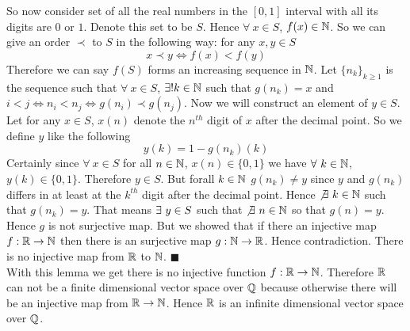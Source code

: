 \documentclass[a4paper, 11pt]{article}
\renewenvironment{proof}{\noindent{\it \textbf{Proof:}}\hspace*{1em}}{\hfill $\blacksquare$\bigskip\\}
\begin{document}
{\begin{itemize}
\begin{proof}
So now consider set of all the real numbers in the $[0,1]$ interval with all its digits are $0$ or $1$. Denote this set to be $S$. Hence $\forall\ x\in S$, $f(x)\in \mathbb{N}$. So  we can give an order $\prec$ to $S$ in the following way: for any $x,y\in S$ $$x\prec y\iff f(x)<f(y)$$Therefore we can say $f(S)$ forms an increasing sequence in $\mathbb{N}$. Let $\{n_k\}_{k\geq 1}$ is the sequence such that $\forall\ x\in S$, $\exists! k\in\mathbb{N}$ such that $g(n_k)=x$ and $i<j\iff n_i<n_j\iff g(n_i)\prec g(n_j)$. Now we will construct an element of $y\in S$. Let for any $x\in S$, $x(n)$ denote the $n^{th}$ digit of $x$ after the decimal point. So we define $y$ like the following $$y(k)=1-g(n_k)(k)$$Certainly since $\forall\ x\in S$ for all $n\in \mathbb{N}$, $x(n)\in\{0,1\}$ we have $\forall\ k\in\mathbb{N}$, $y(k)\in\{0,1\}$. Therefore $y\in S$. But forall $k\in \mathbb{N}$ $g(n_k)\neq y$ since $y$ and $g(n_k)$ differs in at least at the $k^{th}$ digit after the decimal point. Hence $\not\exists\ k\in\mathbb{N}$ such that $g(n_k)=y$. That means $\exists\ y\in S$ such that $\not\exists \ n\in\mathbb{N}$ so that $g(n)=y$. Hence $g$ is not surjective map. But we showed that if there an injective map $f:\mathbb{R}\to\mathbb{N}$ then there is an surjective map $g:\mathbb{N}\to \mathbb{R}$. Hence contradiction. There is no injective map from $\mathbb{R}$ to $\mathbb{N}$.
\end{proof}
With this lemma we get there is no injective function $f:\mathbb{R}\to\mathbb{N}$. Therefore $\mathbb{R}$ can not be a finite dimensional vector space over $\mathbb{Q}$ because otherwise there will be an injective map from $\mathbb{R}\to \mathbb{N}$. Hence $\mathbb{R}$ is an infinite dimensional vector space over $\mathbb{Q}$.
	\end{itemize}

}
\end{document}

